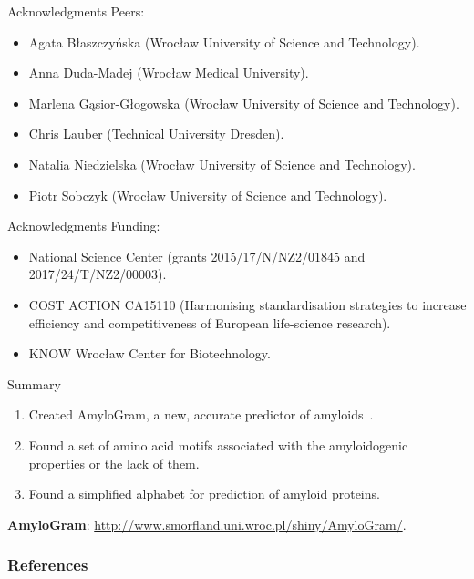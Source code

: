 \documentclass{beamer}\usepackage[]{graphicx}\usepackage[]{color}
\begin{document}
\begin{frame}{Acknowledgments}
Peers:
\begin{itemize}
\item Agata Błaszczyńska (Wrocław University of Science and Technology).
\item Anna Duda-Madej (Wrocław Medical University).
\item Marlena G\k{a}sior-Głogowska (Wrocław University of Science and Technology).
\item Chris Lauber (Technical University Dresden).
\item Natalia Niedzielska (Wrocław University of Science and Technology).
\item Piotr Sobczyk (Wrocław University of Science and Technology).
\end{itemize}

\end{frame}

\begin{frame}{Acknowledgments}
Funding:
\begin{itemize}
\item National Science Center (grants 2015/17/N/NZ2/01845 and 2017/24/T/NZ2/00003).
\item COST ACTION CA15110 (Harmonising standardisation strategies to increase efficiency and competitiveness of European life-science research).
\item KNOW Wrocław Center for Biotechnology.
\end{itemize}

\end{frame}

\begin{frame}{Summary}
\begin{enumerate}
\item Created AmyloGram, a new, accurate predictor of amyloids~\citep{BurdukiewiczAmyloidogenicmotifsrevealed2017}.
\item Found a set of amino acid motifs associated with the amyloidogenic properties or the lack of them.
\item Found a simplified alphabet for prediction of amyloid proteins.
\end{enumerate}

\textbf{AmyloGram}: \url{http://www.smorfland.uni.wroc.pl/shiny/AmyloGram/}.

\end{frame}  


\begin{frame}[allowframebreaks]
        \frametitle{References}
  
  
\end{frame}  
\end{document}
